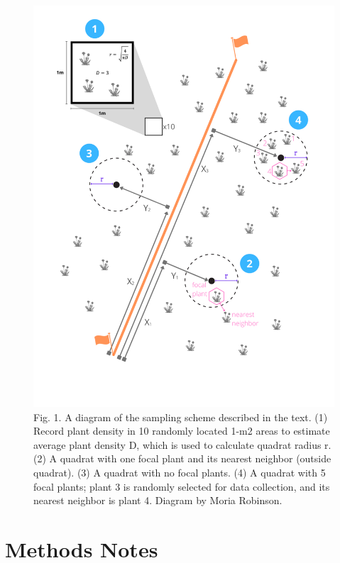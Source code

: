 \documentclass[
  letterpaper,
  DIV=11,
  numbers=noendperiod]{scrreprt}
\begin{document}
\begin{figure}[H]

{\centering \includegraphics{protocols/images/img1.png}

}

\caption{Fig. 1. A diagram of the sampling scheme described in the text.
(1) Record plant density in 10 randomly located 1-m2 areas to estimate
average plant density D, which is used to calculate quadrat radius r.
(2) A quadrat with one focal plant and its nearest neighbor (outside
quadrat). (3) A quadrat with no focal plants. (4) A quadrat with 5 focal
plants; plant 3 is randomly selected for data collection, and its
nearest neighbor is plant 4. Diagram by Moria Robinson.}

\end{figure}%

\section{Methods Notes}\label{methods-notes}
\end{document}
